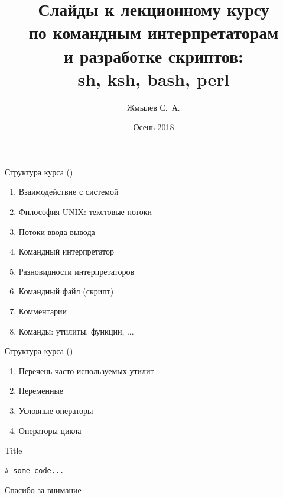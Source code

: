 \documentclass{beamer}
\title{\LARGE Слайды к лекционному курсу \\ по командным интерпретаторам \\
   и разработке скриптов: \\ sh, ksh, bash, perl}
\author{Жмылёв С.~А.}
\date{Осень 2018}
\begin{document}
 \Large

\begin{frame} \titlepage \end{frame}

\begin{frame}[fragile]{Структура курса ()}
\begin{enumerate}

\item Взаимодействие с системой
\item Философия UNIX: текстовые потоки
\item Потоки ввода-вывода
\item Командный интерпретатор
\item Разновидности интерпретаторов
\item Командный файл (скрипт)
\item Комментарии
\item Команды: утилиты, функции, ...

\setcounter{TocEnum}{\value{enumi}}
\end{enumerate}
\end{frame}

\begin{frame}[fragile]{Структура курса ()}
\begin{enumerate} \setcounter{enumi}{\value{TocEnum}}

\item Перечень часто используемых утилит
\item Переменные
\item Условные операторы
\item Операторы цикла

\end{enumerate}
\end{frame}

\begin{frame}[fragile]{Title} \begin{lstlisting}
# some code...
\end{lstlisting} 
\end{frame}

\usebackgroundtemplate{}
\begin{frame}
   \centering \LARGE Спасибо за внимание
\end{frame}
\end{document}
